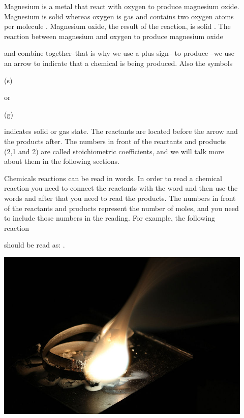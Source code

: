 \documentclass[main.tex]{subfiles}
\begin{document}
\begin{description}
\item[] Magnesium is a metal that react with oxygen to produce magnesium oxide. Magnesium is solid  whereas oxygen is gas and contains two oxygen atoms per molecule . Magnesium oxide, the result of the reaction, is solid . The reaction between magnesium and oxygen to produce magnesium oxide
\begin{center}\end{center}
 and  combine together--that is why we use a plus sign-- to produce --we use an arrow to indicate that a chemical is being produced. Also the symbols \begin{it}(s)\end{it} or \begin{it}(g)\end{it} indicates solid or gas state. The reactants are located before the arrow and the products after. The numbers in front of the reactants and products (2,1 and 2) are called stoichiometric coefficients, and we will talk more about them in the following sections.
\item[]
Chemicals reactions can be read in words. In order to read a chemical reaction you need to connect the reactants with the word  and then use the words  and after that you need to read the products. The numbers in front of the reactants and products represent the number of moles, and you need to include those numbers in the reading. For example, the following reaction
\begin{center}\end{center}
should be read as: . 
\begin{marginfigure}[5cm]%
      \includegraphics{chapter7/figure11}

\end{marginfigure}
\end{description}
\end{document}
